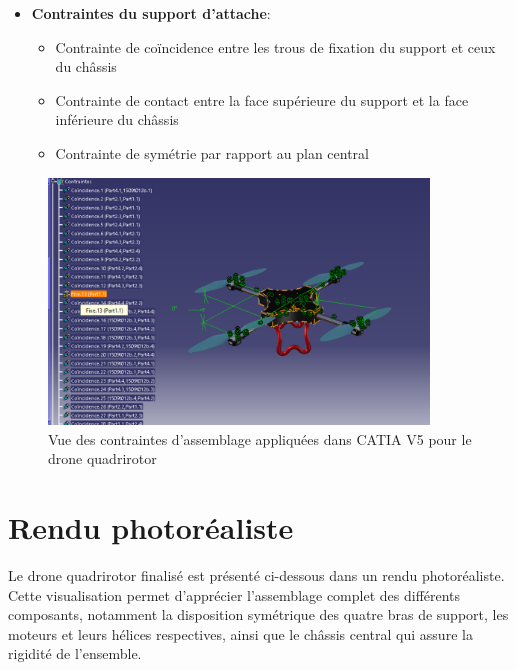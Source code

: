 \documentclass[a4paper,12pt]{report}
\begin{document}
\begin{itemize}
    \item \textbf{Contraintes du support d'attache}:
    \begin{itemize}
        \item Contrainte de coïncidence entre les trous de fixation du support et ceux du châssis
        \item Contrainte de contact entre la face supérieure du support et la face inférieure du châssis
        \item Contrainte de symétrie par rapport au plan central
    \end{itemize}
\end{itemize}

\begin{figure}[H]
    \centering
    \includegraphics[width=0.9\textwidth]{images/contraintes_assemblage_drone.png}
    \caption{Vue des contraintes d'assemblage appliquées dans CATIA V5 pour le drone quadrirotor}
    \label{fig:contraintes_assemblage_drone}
\end{figure}

\section{Rendu photoréaliste}
Le drone quadrirotor finalisé est présenté ci-dessous dans un rendu photoréaliste. Cette visualisation permet d'apprécier l'assemblage complet des différents composants, notamment la disposition symétrique des quatre bras de support, les moteurs et leurs hélices respectives, ainsi que le châssis central qui assure la rigidité de l'ensemble.
\end{document}
